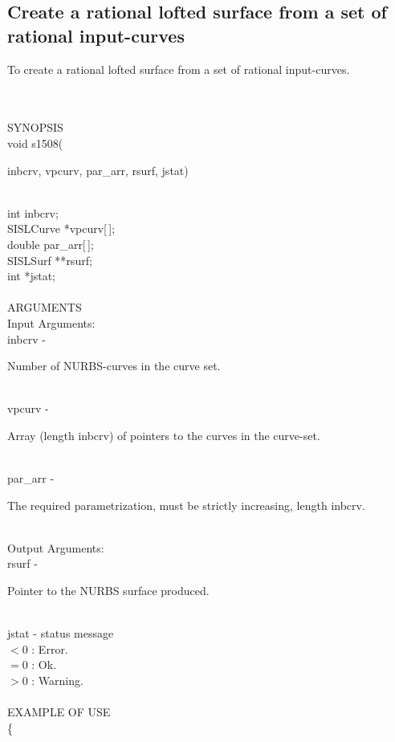 \subsection{Create a rational lofted surface from a set of rational input-curves}
\begin{minipg1}
To create a rational lofted surface from a set of rational input-curves.
\end{minipg1} \\ \\ 
SYNOPSIS\\
      \> void s1508(\begin{minipg3}
	   {\fov inbcrv}, {\fov vpcurv}, {\fov par\_arr}, {\fov rsurf}, {\fov jstat})
	       \end{minipg3}\\
               \>\> int \> {\fov inbcrv};\\
	       \>\> SISLCurve \> *{\fov vpcurv[\,]};\\
	       \>\> double \> {\fov par\_arr[\,]};\\
	       \>\> SISLSurf \> **{\fov rsurf};\\
	       \>\> int \> *{\fov jstat};\\
\\
ARGUMENTS\\
      \> Input Arguments:\\
      \>\> {\fov inbcrv} \> - \> \begin{minipg2}
	           Number of NURBS-curves in the curve set.
		                 \end{minipg2}\\
      \>\> {\fov vpcurv} \> - \> \begin{minipg2}
	           Array (length {\fov inbcrv}) of pointers to the curves in the curve-set.
		                 \end{minipg2}\\
      \>\> {\fov par\_arr} \> - \> \begin{minipg2}
	           The required parametrization, must be strictly increasing, 
		   length {\fov inbcrv}.
		                 \end{minipg2}\\

      \> Output Arguments: \\
      \>\> {\fov rsurf} \> - \> \begin{minipg2}
	           Pointer to the NURBS surface produced.
		                \end{minipg2}\\
      \>\> {\fov jstat} \> - \> status message \\
                 \>\>\>\>\>   $ < 0 $ : Error.\\
		 \>\>\>\>\>   $ = 0 $ : Ok. \\
		 \>\>\>\>\>   $ > 0 $ : Warning.\\
\\
EXAMPLE OF USE\\
               \>      \{ \\
	       
